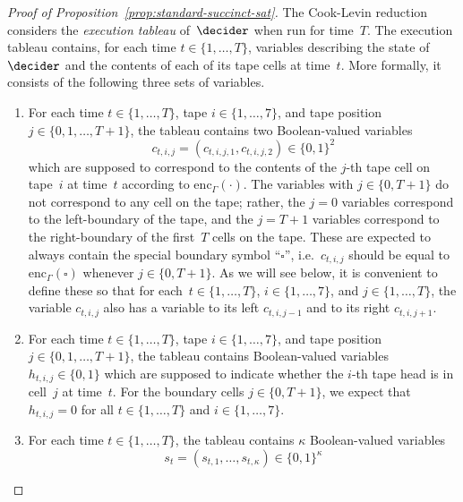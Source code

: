 \begin{proof}[Proof of Proposition~\ref{prop:standard-succinct-sat}]
  The Cook-Levin reduction considers the \emph{execution tableau} of~$\decider$
  when run for time~$T$.
  The execution tableau contains, for each time $t \in \{1, \ldots, T\}$,
  variables describing the state of~$\decider$ and the contents of each of its
  tape cells at time~$t$.
  More formally, it consists of the following three sets of variables.
  \begin{enumerate}
  \item \label{item:cell-variables} For each time $t \in \{1, \ldots, T\}$, tape
    $i \in \{1, \ldots, 7\}$, and tape position $j \in \{0, 1,\ldots, T+1\}$,
    the tableau contains two Boolean-valued variables
    \begin{equation*}
      c_{t, i, j} = (c_{t, i, j, 1}, c_{t, i, j, 2}) \in \{0, 1\}^2
    \end{equation*}
    which are supposed to correspond to the contents of the $j$-th tape cell on
    tape~$i$ at time~$t$ according to $\mathrm{enc}_{\Gamma}(\cdot)$.
    The variables with $j \in \{0, T+1\}$ do not correspond to any cell on the
    tape; rather, the $j=0$ variables correspond to the left-boundary of the
    tape, and the $j=T+1$ variables correspond to the right-boundary of the
    first~$T$ cells on the tape.
    These are expected to always contain the special boundary symbol
    ``$\square$'', i.e.\ $c_{t, i, j}$ should be equal to
    $\mathrm{enc}_{\Gamma}(\square)$ whenever $j \in \{0, T+1\}$.
    As we will see below, it is convenient to define these so that for each~$t
    \in \{1, \ldots, T\}$, $i\in \{1, \ldots, 7\}$, and $j \in \{1, \ldots,
    T\}$, the variable $c_{t, i, j}$ also has a variable to its left $c_{t, i,
      j-1}$ and to its right $c_{t, i, j+1}$.
  \item \label{item:head-variables} For each time $t \in \{1, \ldots, T\}$, tape
    $i \in \{1, \ldots, 7\}$, and tape position $j \in \{0, 1,\ldots, T+1\}$,
    the tableau contains Boolean-valued variables $h_{t, i, j} \in \{0, 1\}$
    which are supposed to indicate whether the $i$-th tape head is in cell~$j$
    at time~$t$.
    For the boundary cells $j \in \{0, T+1\}$, we expect that $h_{t, i, j} = 0$
    for all $t \in \{1, \ldots, T\}$ and $i \in \{1, \ldots, 7\}$.
  \item For each time $t\in \{1, \ldots, T\}$, the tableau contains $\kappa$
    Boolean-valued variables
    \begin{equation*}
      s_t = (s_{t, 1}, \ldots, s_{t, \kappa}) \in \{0, 1\}^\kappa

\end{equation*}
\end{enumerate}
\end{proof}

